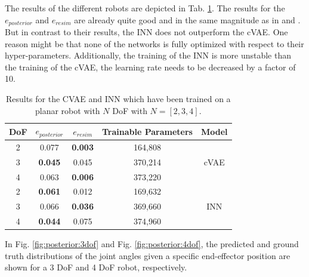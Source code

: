 \documentclass[conference]{IEEEtran}
\begin{document}
The results of the different robots are depicted in Tab. \ref{tab:results}. The results for the $e_{posterior}$ and $e_{resim}$ are already quite good and in the same magnitude as in  \cite{Ardizzone2018} and \cite{Kruse2019}. But in contrast to their results, the INN does not outperform the cVAE. One reason might be that none of the networks is fully optimized with respect to their hyper-parameters. Additionally, the training of the INN is more unstable than the training of the cVAE, the learning rate needs to be decreased by a factor of 10. 
\begin{table}[h]
\centering
\begin{tabular}{|c|c|c|c|c|}
\hline
 DoF & $e_{posterior}$ & $e_{resim}$ & Trainable Parameters & Model \\
 \hline
 2  & 0.077 & \textbf{0.003} & 164,808 & \\
 3  & \textbf{0.045} & 0.045 & 370,214 & cVAE \\
 4  & 0.063 & \textbf{0.006} & 373,220 & \\
 \hline
 2  & \textbf{0.061} & 0.012 & 169,632 & \\
 3  & 0.066 & \textbf{0.036} & 369,660 & INN \\
 4  & \textbf{0.044} & 0.075 & 374,960 & \\
 \hline
\end{tabular}
\vspace{5pt}
\caption{\label{tab:results} Results for the CVAE and INN which have been trained on a planar robot with $N$ DoF with $N=[2, 3, 4]$.}
\end{table}
In Fig. \ref{fig:posterior:3dof} and Fig. \ref{fig:posterior:4dof}, the predicted and ground truth distributions of the joint angles given a specific end-effector position are shown for a 3 DoF and 4 DoF robot, respectively.
\end{document}
